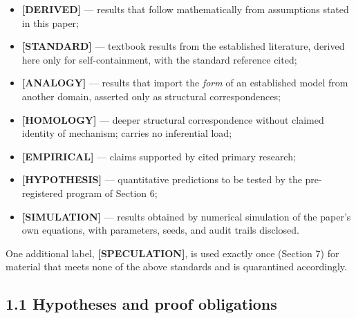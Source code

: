 \documentclass[11pt,twocolumn]{article}
\theoremstyle{gttdef}
\theoremstyle{gttplain}
\begin{document}
\begin{itemize}

\item \textbf{[DERIVED]} --- results that follow mathematically from assumptions stated in this paper;

\item \textbf{[STANDARD]} --- textbook results from the established literature, derived here only for self-containment, with the standard reference cited;

\item \textbf{[ANALOGY]} --- results that import the \emph{form} of an established model from another domain, asserted only as structural correspondences;

\item \textbf{[HOMOLOGY]} --- deeper structural correspondence without claimed identity of mechanism; carries no inferential load;

\item \textbf{[EMPIRICAL]} --- claims supported by cited primary research;

\item \textbf{[HYPOTHESIS]} --- quantitative predictions to be tested by the pre-registered program of Section 6;

\item \textbf{[SIMULATION]} --- results obtained by numerical simulation of the paper's own equations, with parameters, seeds, and audit trails disclosed.

\end{itemize}

One additional label, \textbf{[SPECULATION]}, is used exactly once (Section 7) for material that meets none of the above standards and is quarantined accordingly.

\subsection*{1.1 Hypotheses and proof obligations}
\end{document}
